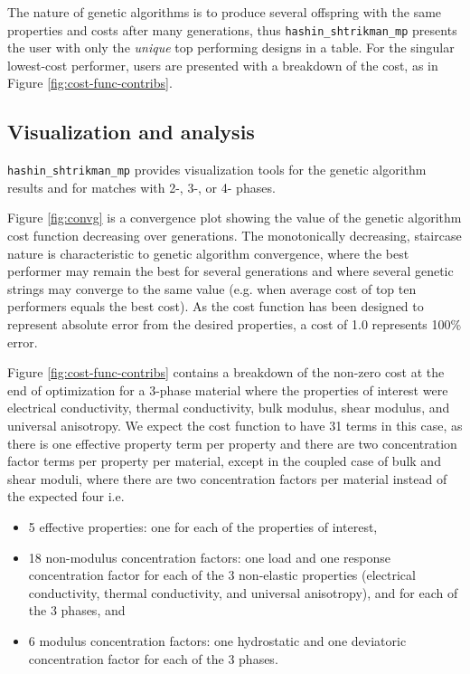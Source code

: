 \documentclass[letterpaper,12pt]{formatfile}
\begin{document}
The nature of genetic algorithms is to produce several offspring with the same properties and costs after many generations, thus \verb|hashin_shtrikman_mp| presents the user with only the \textit{unique} top performing designs in a table. For the singular lowest-cost performer, users are presented with a breakdown of the cost, as in Figure \ref{fig:cost-func-contribs}.

\subsection{Visualization and analysis} \label{subsec:viz}
\verb|hashin_shtrikman_mp| provides visualization tools for the genetic algorithm results and for matches with 2-, 3-, or 4- phases. 

Figure \ref{fig:convg} is a convergence plot showing the value of the genetic algorithm cost function decreasing over generations. The monotonically decreasing, staircase nature is characteristic to genetic algorithm convergence, where the best performer may remain the best for several generations and where several genetic strings may converge to the same value (e.g. when average cost of top ten performers equals the best cost). As the cost function has been designed to represent absolute error from the desired properties, a cost of 1.0 represents 100\% error. 

Figure \ref{fig:cost-func-contribs} contains a breakdown of the non-zero cost at the end of optimization for a 3-phase material where the properties of interest were electrical conductivity, thermal conductivity, bulk modulus, shear modulus, and universal anisotropy. We expect the cost function to have 31 terms in this case, as there is one effective property term per property and there are two concentration factor terms per property per material, except in the coupled case of bulk and shear moduli, where there are two concentration factors per material instead of the expected four i.e.
\begin{itemize}
\item 5 effective properties: one for each of the properties of interest,
\item 18 non-modulus concentration factors: one load and one response concentration factor for each of the 3 non-elastic properties (electrical conductivity, thermal conductivity, and universal anisotropy), and for each of the 3 phases, and
\item 6 modulus concentration factors: one hydrostatic and one deviatoric concentration factor for each of the 3 phases.
\end{itemize}
\end{document}
